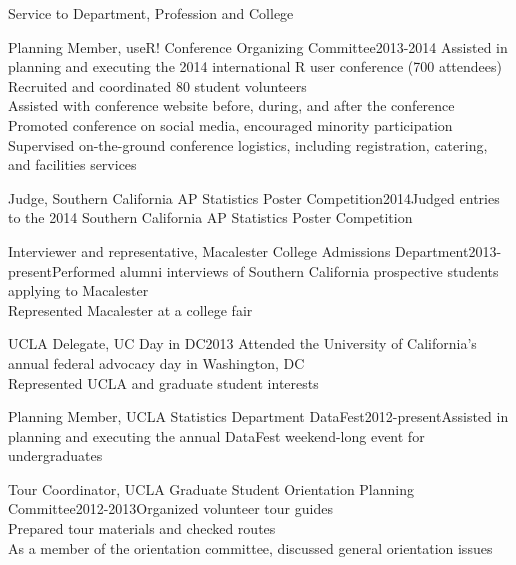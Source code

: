 \documentclass{resume} %
\begin{document}
\begin{rSection}{Service to Department, Profession and College}

\begin{sSubsection}{Planning Member, useR! Conference Organizing Committee}{}{2013-2014}{
Assisted in planning and executing the 2014 international R user conference (700 attendees)
\\ Recruited and coordinated 80 student volunteers
\\ Assisted with conference website before, during, and after the conference
\\ Promoted conference on social media, encouraged minority participation
\\ Supervised on-the-ground conference logistics, including registration, catering, and facilities services}{}
\end{sSubsection}

\begin{sSubsection}{Judge, Southern California AP Statistics Poster Competition}{}{2014}{Judged entries to the 2014 Southern California AP Statistics Poster Competition}{}
\end{sSubsection}

\begin{sSubsection}{Interviewer and representative, Macalester College Admissions Department}{}{2013-present}{Performed alumni interviews of Southern California prospective students applying to Macalester
\\ Represented Macalester at a college fair}{}
\end{sSubsection}

\begin{sSubsection}{UCLA Delegate, UC Day in DC}{}{2013}{
Attended the University of California's annual federal advocacy day in Washington, DC
\\ Represented UCLA and graduate student interests}{}
\end{sSubsection}

\begin{sSubsection}{Planning Member, UCLA Statistics Department DataFest}{}{2012-present}{Assisted in planning and executing the annual DataFest weekend-long event for undergraduates}{}
\end{sSubsection}

\begin{sSubsection}{Tour Coordinator, UCLA Graduate Student Orientation Planning Committee}{}{2012-2013}{Organized volunteer tour guides
\\ Prepared tour materials and checked routes
\\ As a member of the orientation committee, discussed general orientation issues}{}
\end{sSubsection}


\end{rSection}
\end{document}
